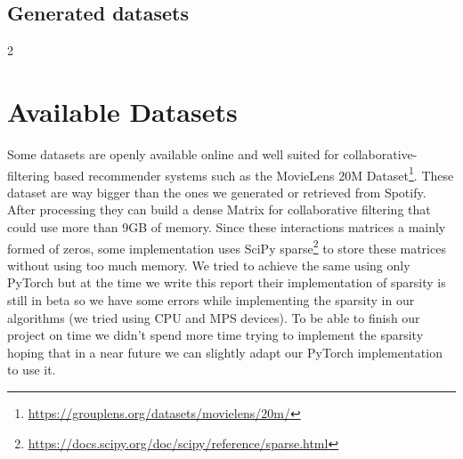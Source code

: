 \newpage
\subsection{Generated datasets} \label{subsec:artificial_data}
\begin{multicols}{2}
\end{multicols}


\section{Available Datasets}
Some datasets are openly available online and well suited for collaborative-filtering based recommender systems such as the MovieLens 20M Dataset\footnote{\url{https://grouplens.org/datasets/movielens/20m/}}. These dataset are way bigger than the ones we generated or retrieved from Spotify. After processing they can build a dense Matrix for collaborative filtering that could use more than 9GB of memory. Since these interactions matrices a mainly formed of zeros, some implementation uses SciPy sparse\footnote{\url{https://docs.scipy.org/doc/scipy/reference/sparse.html}} to store these matrices without using too much memory. We tried to achieve the same using only PyTorch but at the time we write this report their implementation of sparsity is still in beta so we have some errors while implementing the sparsity in our algorithms (we tried using CPU and MPS devices). To be able to finish our project on time we didn't spend more time trying to implement the sparsity hoping that in a near future we can slightly adapt our PyTorch implementation to use it.
